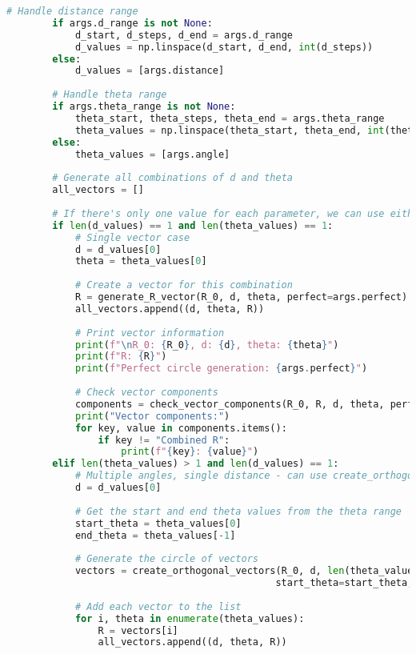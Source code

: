 \begin{lstlisting}[language=Python]
        # Handle distance range
        if args.d_range is not None:
            d_start, d_steps, d_end = args.d_range
            d_values = np.linspace(d_start, d_end, int(d_steps))
        else:
            d_values = [args.distance]
        
        # Handle theta range
        if args.theta_range is not None:
            theta_start, theta_steps, theta_end = args.theta_range
            theta_values = np.linspace(theta_start, theta_end, int(theta_steps))
        else:
            theta_values = [args.angle]
        
        # Generate all combinations of d and theta
        all_vectors = []
        
        # If there's only one value for each parameter, we can use either method
        if len(d_values) == 1 and len(theta_values) == 1:
            # Single vector case
            d = d_values[0]
            theta = theta_values[0]
            
            # Create a vector for this combination
            R = generate_R_vector(R_0, d, theta, perfect=args.perfect)
            all_vectors.append((d, theta, R))
            
            # Print vector information
            print(f"\nR_0: {R_0}, d: {d}, theta: {theta}")
            print(f"R: {R}")
            print(f"Perfect circle generation: {args.perfect}")
            
            # Check vector components
            components = check_vector_components(R_0, R, d, theta, perfect=args.perfect)
            print("Vector components:")
            for key, value in components.items():
                if key != "Combined R":
                    print(f"{key}: {value}")
        elif len(theta_values) > 1 and len(d_values) == 1:
            # Multiple angles, single distance - can use create_orthogonal_vectors for the circle
            d = d_values[0]
            
            # Get the start and end theta values from the theta range
            start_theta = theta_values[0]
            end_theta = theta_values[-1]
            
            # Generate the circle of vectors
            vectors = create_orthogonal_vectors(R_0, d, len(theta_values), perfect=args.perfect, 
                                               start_theta=start_theta, end_theta=end_theta)
            
            # Add each vector to the list
            for i, theta in enumerate(theta_values):
                R = vectors[i]
                all_vectors.append((d, theta, R))
                

\end{lstlisting}
